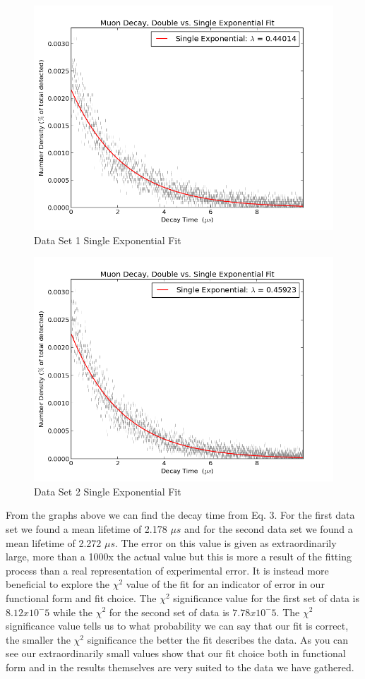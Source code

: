 \begin{figure}[H]
\begin{center}
\includegraphics[width=4 in]{graph_EPBB1_SnglExp.png}
\caption{Data Set 1 Single Exponential Fit}
\end{center}
\end{figure}

\begin{figure}[H]
\begin{center}
\includegraphics[width=4 in]{graph_EPBB2_SnglExp.png}
\caption{Data Set 2 Single Exponential Fit}
\end{center}
\end{figure}

From the graphs above we can find the decay time from Eq. 3. For the first data set we found a mean lifetime of 2.178 $\mu s$ and for the second data set we found a mean lifetime of 2.272 $\mu s$.  The error on this value is given as extraordinarily large, more than a 1000x the actual value but this is more a result of the fitting process than a real representation of experimental error.  It is instead more beneficial to explore the $\chi^2$ value of the fit for an indicator of error in our functional form and fit choice.  The $\chi^2$ significance value for the first set of data is $8.12 x 10^-5$ while the $\chi^2$ for the second set of data is $7.78 x 10^-5$. The $\chi^2$ significance value tells us to what probability we can say that our fit is correct, the smaller the $\chi^2$ significance the better the fit describes the data. As you can see our extraordinarily small values show that our fit choice both in functional form and in the results themselves are very suited to the data we have gathered. 

